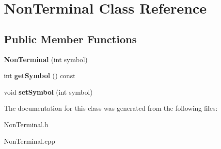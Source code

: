 \hypertarget{classNonTerminal}{\section{Non\-Terminal Class Reference}
\label{classNonTerminal}
}
\subsection*{Public Member Functions}
\begin{DoxyCompactItemize}
\item 
\hypertarget{classNonTerminal_abb27b4da50abffd6f3eec58f85a88ae5}{{\bfseries Non\-Terminal} (int symbol)}\label{classNonTerminal_abb27b4da50abffd6f3eec58f85a88ae5}

\item 
\hypertarget{classNonTerminal_a86179d5eace904ea86f0cb2dc1a72916}{int {\bfseries get\-Symbol} () const }\label{classNonTerminal_a86179d5eace904ea86f0cb2dc1a72916}

\item 
\hypertarget{classNonTerminal_ab691c816bc4b6e91bd9f982c79c5901c}{void {\bfseries set\-Symbol} (int symbol)}\label{classNonTerminal_ab691c816bc4b6e91bd9f982c79c5901c}

\end{DoxyCompactItemize}


The documentation for this class was generated from the following files\-:\begin{DoxyCompactItemize}
\item 
Non\-Terminal.\-h\item 
Non\-Terminal.\-cpp\end{DoxyCompactItemize}

